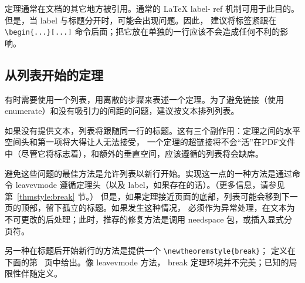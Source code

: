 \documentclass{article}
\newcommand{\ntt}{%
  \fontfamily\ttdefault \fontseries\mddefault \fontshape\updefault
  \selectfont
}
\DeclareRobustCommand{\cn}[1]{{\ntt\bslchar#1}}
\DeclareRobustCommand{\pkg}[1]{\textsf{#1}}
\DeclareRobustCommand{\env}[1]{{\ntt#1}}
\def\latex/{{\protect\LaTeX}}
\begin{document}
定理通常在文档的其它地方被引用。通常的 \latex/ \cn{label}-\cn{ref} 机制可用于此目的。
但是，当 \cn{label} 与标题分开时，可能会出现问题。因此，
建议将标签紧跟在 \verb+\begin{...}[...]+ 命令后面；把它放在单独的一行应该不会造成任何不利的影响。

\subsection{从列表开始的定理}
\label{ThmWithList}

有时需要使用一个列表，用离散的步骤来表述一个定理。为了避免链接（使用 \env{enumerate}）和没有吸引力的间距的问题，建议按文本排列列表。

如果没有提供文本，列表将跟随同一行的标题。这有三个副作用：定理之间的水平空间头和第一项将大得让人无法接受，
一个定理的超链接将不会“活”在PDF文件中（尽管它将标志着），和额外的垂直空间，应该遵循的列表将会缺席。

避免这些问题的最佳方法是允许列表以新行开始。实现这一点的一种方法是通过命令 \cn{leavevmode}
遵循定理头（以及 \cn{label}，如果存在的话）。（更多信息，请参见第~\ref{thmstyle:break} 节。）
但是，如果定理接近页面的底部，列表可能会移到下一页的顶部，留下孤立的标题。如果发生这种情况，
必须作为异常处理，在文本为不可更改的后处理；此时，推荐的修复方法是调用 \pkg{needspace} \cite{NDS} 包，或插入显式分页符。

另一种在标题后开始新行的方法是提供一个 \verb+\newtheoremstyle{break}+；
定义在下面的第~\pageref{thmstyle:break} 页中给出。像 \cn{leavevmode} 方法，\env{break} 定理环境并不完美；已知的局限性伴随定义。



\end{document}
